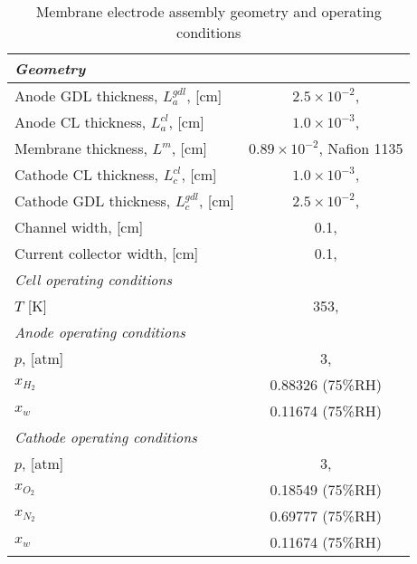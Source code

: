 \documentclass[]{elsart}
\begin{document}
 \begin{table}[ptb]\begin{center}
 \caption{Membrane electrode assembly geometry and operating conditions}
 \label{tb:data_geometry}
 \begin{tabular}{lc}  \hline \hline
 	\it{Geometry} \\ \hline
	Anode GDL thickness, $L_a^{gdl}$, [cm]                              &$2.5\times10^{-2}$, \cite{Sun05} \\
	Anode CL thickness, $L_a^{cl}$, [cm]                                  & $1.0\times10^{-3}$, \cite{Sun05}  \\
	Membrane thickness, $L^{m}$, [cm]                                    & $0.89\times10^{-2}$, Nafion 1135 \\
	Cathode CL thickness, $L_c^{cl}$, [cm]                               & $1.0\times10^{-3}$, \cite{Sun05}  \\ 
	Cathode GDL thickness, $L_c^{gdl}$, [cm]                          &$2.5\times10^{-2}$, \cite{Sun05} \\
	Channel width, [cm]                         					   &0.1, \cite{Sun05}                             \\
	Current collector width, [cm]                                   		   &0.1, \cite{Sun05}                            \\
	\it{Cell operating conditions} \\ \hline
	$T$ [K]                                                    & 353, \cite{Sun05}   \\
 	\it{Anode operating conditions} \\ \hline
	$p$, [atm]                                               & 3, \cite{Sun05} \\
	$x_{H_2}$                                               & 0.88326 (75\%RH) \\
	$x_{w}$                                                   & 0.11674 (75\%RH) \\
	\it{Cathode operating conditions} \\ \hline
	$p$, [atm]                                               &3, \cite{Sun05} \\
	$x_{O_2}$                                               &0.18549 (75\%RH) \\
	$x_{N_2}$                                               &0.69777 (75\%RH) \\
	$x_{w}$                                                   &0.11674 (75\%RH) \\
	\hline \hline
\end{tabular} \end{center} \end{table}
\end{document}
